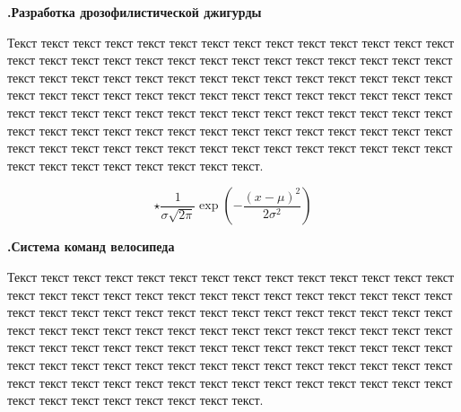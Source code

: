 \documentclass[unicode, 12pt, a4paper, oneside]{article}
\newcounter{qcnt}
\newcommand{\quest}[1]{\par\addtocounter{qcnt}{1}\textbf{\arabic{qcnt}.\quad #1}}
\begin{document}
\quest{Разработка дрозофилистической джигурды}

Текст текст текст текст текст текст текст текст текст текст текст текст текст текст текст текст текст текст текст текст текст текст текст текст текст текст текст текст текст текст текст текст текст текст текст текст текст текст текст текст текст текст текст текст текст текст текст текст текст текст текст текст текст текст текст текст текст текст текст текст текст текст текст текст текст текст текст текст текст текст текст текст текст текст текст текст текст текст текст текст текст текст текст текст текст текст текст текст текст текст текст текст текст текст текст текст текст текст текст текст текст текст текст текст текст текст.

 \begin{equation}
 \star
   \label{eq:normal_dist}
   \frac{1}{\sigma\sqrt{2\pi}}
     \exp\left(-\frac{(x-\mu)^2}{2\sigma^2}\right)
 \end{equation}

\quest{Система команд велосипеда}

Текст текст текст текст текст текст текст текст текст текст текст текст текст текст текст текст текст текст текст текст текст текст текст текст текст текст текст текст текст текст текст текст текст текст текст текст текст текст текст текст текст текст текст текст текст текст текст текст текст текст текст текст текст текст текст текст текст текст текст текст текст текст текст текст текст текст текст текст текст текст текст текст текст текст текст текст текст текст текст текст текст текст текст текст текст текст текст текст текст текст текст текст текст текст текст текст текст текст текст текст текст текст текст текст текст текст.
\end{document}
